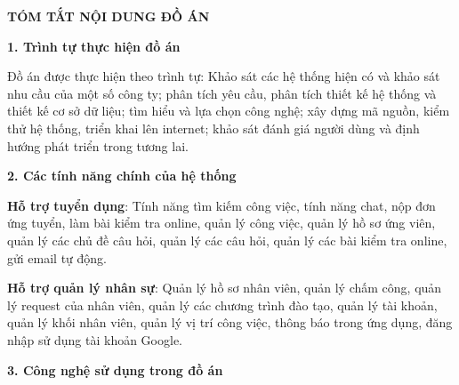 
\raggedbottom
\def\thesection{\arabic{section}}

\begin{center}
    \Large{\textbf{TÓM TẮT NỘI DUNG ĐỒ ÁN}}\\
\end{center}

\noindent\textbf{1. Trình tự thực hiện đồ án}

Đồ án được thực hiện theo trình tự: Khảo sát các hệ thống hiện có và khảo sát nhu cầu của một số công ty; phân tích yêu cầu, phân tích thiết kế hệ thống và thiết kế cơ sở dữ liệu; tìm hiểu và lựa chọn công nghệ; xây dựng mã nguồn, kiểm thử hệ thống, triển khai lên internet; khảo sát đánh giá người dùng và định hướng phát triển trong tương lai.

\noindent\textbf{2. Các tính năng chính của hệ thống}

\textbf{Hỗ trợ tuyển dụng}: Tính năng tìm kiếm công việc, tính năng chat, nộp đơn ứng tuyển, làm bài kiểm tra online, quản lý công việc, quản lý hồ sơ ứng viên, quản lý các chủ đề câu hỏi, quản lý các câu hỏi, quản lý các bài kiểm tra online, gửi email tự động.

\textbf{Hỗ trợ quản lý nhân sự}: Quản lý hồ sơ nhân viên, quản lý chấm công, quản lý request của nhân viên, quản lý các chương trình đào tạo, quản lý tài khoản, quản lý khối nhân viên, quản lý vị trí công việc, thông báo trong ứng dụng, đăng nhập sử dụng tài khoản Google.

\noindent\textbf{3. Công nghệ sử dụng trong đồ án}

